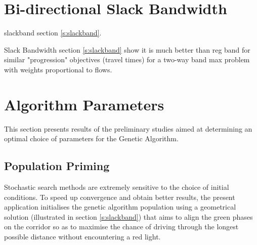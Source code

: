 



\section{Bi-directional Slack Bandwidth}
slackband section \ref{s:slackband}.



Slack Bandwidth section \ref{s:slackband} show it is much better than reg band for similar "progression" objectives (travel times) for a two-way band max problem with weights proportional to flows. 

\section{Algorithm Parameters}
This section presents results of the preliminary studies aimed at determining an optimal choice of parameters for the Genetic Algorithm.

\subsection{Population Priming} \label{s:poppriming}
Stochastic search methods are extremely sensitive to the choice of initial conditions. To speed up convergence and obtain better results, the present application initialises the genetic algorithm population using a geometrical solution (illustrated in section \ref{s:slackband}) that aims to align the green phases on the corridor so as to maximise the chance of driving through the longest possible distance without encountering a red light.

